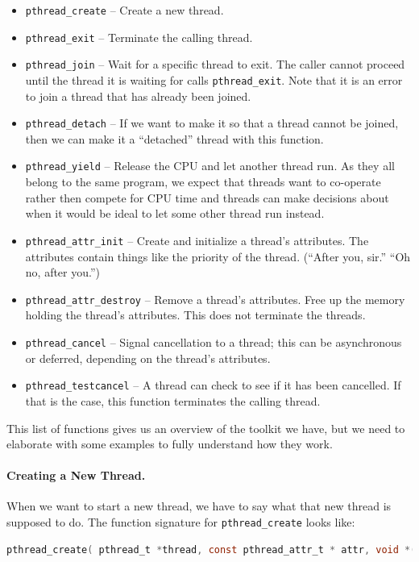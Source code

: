 \documentclass[a4paper]{report}
\begin{document}
\begin{appendices}
\begin{itemize}
	\item \texttt{pthread\_create} -- Create a new thread. 
	\item \texttt{pthread\_exit} -- Terminate the calling thread.
	\item \texttt{pthread\_join} -- Wait for a specific thread to exit. The caller cannot proceed until the thread it is waiting for calls \texttt{pthread\_exit}. Note that it is an error to join a thread that has already been joined.
	\item \texttt{pthread\_detach} -- If we want to make it so that a thread cannot be joined, then we can make it a ``detached'' thread with this function.
	\item \texttt{pthread\_yield} -- Release the CPU and let another thread run. As they all belong to the same program, we expect that threads want to co-operate rather then compete for CPU time and threads can make decisions about when it would be ideal to let some other thread run instead.
	\item \texttt{pthread\_attr\_init} -- Create and initialize a thread's attributes. The attributes contain things like the priority of the thread. (``After you, sir.'' ``Oh no, after you.'')
	\item \texttt{pthread\_attr\_destroy} -- Remove a thread's attributes. Free up the memory holding the thread's attributes. This does not terminate the threads.
	\item \texttt{pthread\_cancel} -- Signal cancellation to a thread; this can be asynchronous or deferred, depending on the thread's attributes.
	\item \texttt{pthread\_testcancel} -- A thread can check to see if it has been cancelled. If that is the case, this function terminates the calling thread.
\end{itemize}

This list of functions gives us an overview of the toolkit we have, but we need to elaborate with some examples to fully understand how they work.

\paragraph{Creating a New Thread.}

When we want to start a new thread, we have to say what that new thread is supposed to do. The function signature for \texttt{pthread\_create} looks like:

\begin{lstlisting}[language=C]
pthread_create( pthread_t *thread, const pthread_attr_t * attr, void *(*start_routine)( void * ), void *arg );
\end{lstlisting}


\end{appendices}
\end{document}
